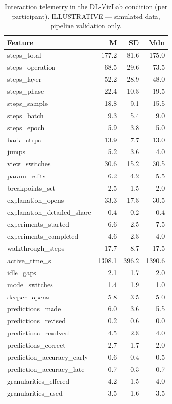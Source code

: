 \begin{table}[htbp]
\centering
\small
\caption{Interaction telemetry in the DL-VizLab condition (per participant). ILLUSTRATIVE — simulated data, pipeline validation only.}
\label{tab:T13}
\begin{tabular}{lrrr}
\toprule
Feature & M & SD & Mdn \\
\midrule
steps\_total & 177.2 & 81.6 & 175.0 \\
steps\_operation & 68.5 & 29.6 & 73.5 \\
steps\_layer & 52.2 & 28.9 & 48.0 \\
steps\_phase & 22.4 & 10.8 & 19.5 \\
steps\_sample & 18.8 & 9.1 & 15.5 \\
steps\_batch & 9.3 & 5.4 & 9.0 \\
steps\_epoch & 5.9 & 3.8 & 5.0 \\
back\_steps & 13.9 & 7.7 & 13.0 \\
jumps & 5.2 & 3.6 & 4.0 \\
view\_switches & 30.6 & 15.2 & 30.5 \\
param\_edits & 6.2 & 4.2 & 5.5 \\
breakpoints\_set & 2.5 & 1.5 & 2.0 \\
explanation\_opens & 33.3 & 17.8 & 30.5 \\
explanation\_detailed\_share & 0.4 & 0.2 & 0.4 \\
experiments\_started & 6.6 & 2.5 & 7.5 \\
experiments\_completed & 4.6 & 2.8 & 4.0 \\
walkthrough\_steps & 17.7 & 8.7 & 17.5 \\
active\_time\_s & 1308.1 & 396.2 & 1390.6 \\
idle\_gaps & 2.1 & 1.7 & 2.0 \\
mode\_switches & 1.4 & 1.9 & 1.0 \\
deeper\_opens & 5.8 & 3.5 & 5.0 \\
predictions\_made & 6.0 & 3.6 & 5.5 \\
predictions\_revised & 0.2 & 0.6 & 0.0 \\
predictions\_resolved & 4.5 & 2.8 & 4.0 \\
predictions\_correct & 2.7 & 1.7 & 2.0 \\
prediction\_accuracy\_early & 0.6 & 0.4 & 0.5 \\
prediction\_accuracy\_late & 0.7 & 0.3 & 0.7 \\
granularities\_offered & 4.2 & 1.5 & 4.0 \\
granularities\_used & 3.5 & 1.6 & 3.5 \\
\bottomrule
\end{tabular}
\end{table}

